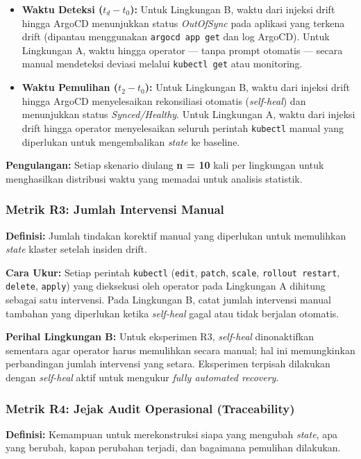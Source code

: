 \begin{itemize}
    \item \textbf{Waktu Deteksi ($t_d - t_0$):} Untuk Lingkungan B, waktu dari injeksi drift hingga ArgoCD menunjukkan status \textit{OutOfSync} pada aplikasi yang terkena drift (dipantau menggunakan \texttt{argocd app get} dan log ArgoCD). Untuk Lingkungan A, waktu hingga operator --- tanpa prompt otomatis --- secara manual mendeteksi deviasi melalui \texttt{kubectl get} atau monitoring.
    
    \item \textbf{Waktu Pemulihan ($t_2 - t_0$):} Untuk Lingkungan B, waktu dari injeksi drift hingga ArgoCD menyelesaikan rekonsiliasi otomatis (\textit{self-heal}) dan menunjukkan status \textit{Synced/Healthy}. Untuk Lingkungan A, waktu dari injeksi drift hingga operator menyelesaikan seluruh perintah \texttt{kubectl} manual yang diperlukan untuk mengembalikan \textit{state} ke baseline.
\end{itemize}

\textbf{Pengulangan:} Setiap skenario diulang \textbf{n = 10} kali per lingkungan untuk menghasilkan distribusi waktu yang memadai untuk analisis statistik.

\subsubsection{Metrik R3: Jumlah Intervensi Manual}
\textbf{Definisi:} Jumlah tindakan korektif manual yang diperlukan untuk memulihkan \textit{state} klaster setelah insiden drift.

\textbf{Cara Ukur:} Setiap perintah \texttt{kubectl} (\texttt{edit}, \texttt{patch}, \texttt{scale}, \texttt{rollout restart}, \texttt{delete}, \texttt{apply}) yang dieksekusi oleh operator pada Lingkungan A dihitung sebagai satu intervensi. Pada Lingkungan B, catat jumlah intervensi manual tambahan yang diperlukan ketika \textit{self-heal} gagal atau tidak berjalan otomatis.

\textbf{Perihal Lingkungan B:} Untuk eksperimen R3, \textit{self-heal} dinonaktifkan sementara agar operator harus memulihkan secara manual; hal ini memungkinkan perbandingan jumlah intervensi yang setara. Eksperimen terpisah dilakukan dengan \textit{self-heal} aktif untuk mengukur \textit{fully automated recovery}.

\subsubsection{Metrik R4: Jejak Audit Operasional (Traceability)}
\textbf{Definisi:} Kemampuan untuk merekonstruksi siapa yang mengubah \textit{state}, apa yang berubah, kapan perubahan terjadi, dan bagaimana pemulihan dilakukan.

